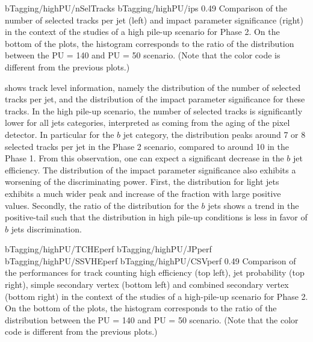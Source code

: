                      {bTagging/highPU/nSelTracks}
                     {bTagging/highPU/ips}
                     {0.49}
                     {Comparison of the number of selected tracks per jet (left)
                     and impact parameter significance (right) in the context of
                     the studies of a high pile-up scenario for Phase 2.  On the
                     bottom of the plots, the histogram corresponds to the ratio
                     of the distribution between the PU = 140 and PU = 50
                     scenario.  (Note that the color code is different from the
                     previous plots.) }

     shows track level information, namely
    the distribution of the number of selected tracks per jet, and the
    distribution of the impact parameter significance for these tracks. In the
    high pile-up scenario, the number of selected tracks is significantly lower
    for all jets categories, interpreted as coming from the aging of the pixel
    detector. In particular for the $b$ jet category, the distribution peaks
    around 7 or 8 selected tracks per jet in the Phase 2 scenario, compared to
    around 10 in the Phase 1. From this observation, one can expect a
    significant decrease in the $b$ jet efficiency. The distribution of the
    impact parameter significance also exhibits a worsening of the
    discriminating power. First, the distribution for light jets exhibits a much
    wider peak and increase of the fraction with large positive values.
    Secondly, the ratio of the distribution for the $b$ jets shows a trend in
    the positive-tail such that the distribution in high pile-up conditions is
    less in favor of $b$ jets discrimination.

                      {bTagging/highPU/TCHEperf}
                      {bTagging/highPU/JPperf}
                      {bTagging/highPU/SSVHEperf}
                      {bTagging/highPU/CSVperf}
                      {0.49}
                      {Comparison of the performances for track counting high
                      efficiency (top left), jet probability (top right), simple
                      secondary vertex (bottom left) and combined secondary
                      vertex (bottom right) in the context of the studies of a
                      high-pile-up scenario for Phase 2. On the bottom of the
                      plots, the histogram corresponds to the ratio of the
                      distribution between the PU = 140 and PU = 50 scenario.
                      (Note that the color code is different from the previous
                      plots.) }

